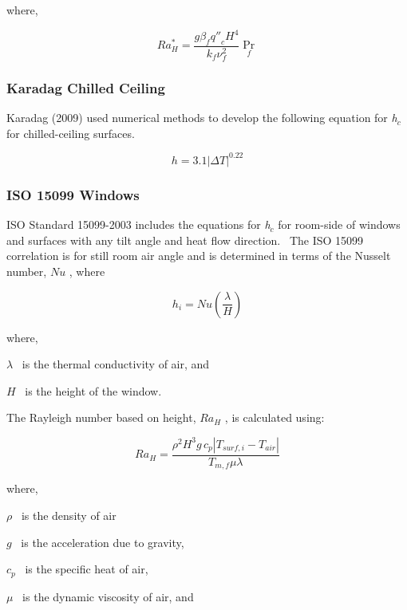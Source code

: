 where,

\begin{equation}
Ra_H^* = \frac{{g{\beta_f}{{q''}_c}{H^4}}}{{{k_f}\nu_f^2}}{\Pr_f}
\end{equation}

\subsubsection{Karadag Chilled Ceiling}\label{karadag-chilled-ceiling}

Karadag (2009) used numerical methods to develop the following equation for \emph{h\(_{c}\)} for chilled-ceiling surfaces.

\begin{equation}
h = 3.1{\left| {\Delta T} \right|^{0.22}}
\end{equation}

\subsubsection{ISO 15099 Windows}\label{iso-15099-windows}

ISO Standard 15099-2003 includes the equations for \emph{h\(_{c}\)} for room-side of windows and surfaces with any tilt angle and heat flow direction.~ The ISO 15099 correlation is for still room air angle and is determined in terms of the Nusselt number, \(Nu\) , where

\begin{equation}
{h_i} = Nu\left( {\frac{\lambda }{H}} \right)
\end{equation}

where,

\(\lambda\) ~is the thermal conductivity of air, and

\(H\) ~is the height of the window.

The Rayleigh number based on height, \(R{a_H}\) , is calculated using:

\begin{equation}
R{a_H} = \frac{{{\rho ^2}{H^3}g\,{c_p}\left| {{T_{surf,i}} - {T_{air}}} \right|}}{{{T_{m,f}}\mu \lambda }}
\end{equation}

where,

\(\rho\) ~is the density of air

\(g\) ~is the acceleration due to gravity,

\({c_p}\) ~is the specific heat of air,

\(\mu\) ~is the dynamic viscosity of air, and

